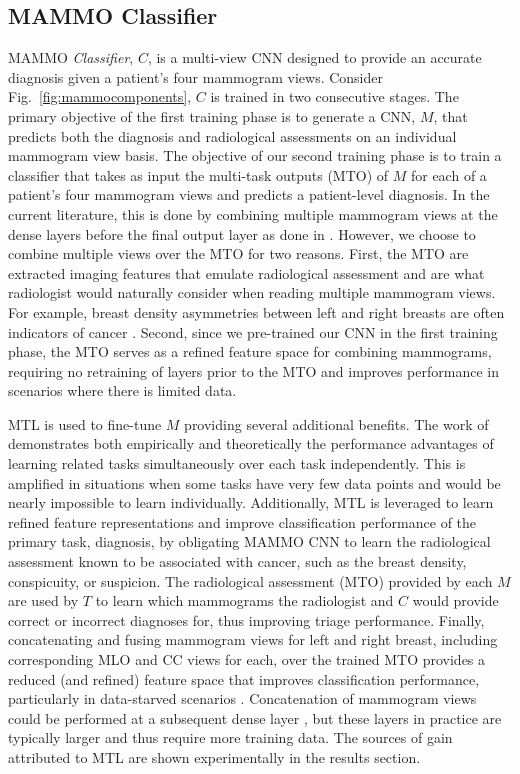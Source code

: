 \documentclass[journal]{IEEEtran}
\begin{document}
\subsection{MAMMO Classifier}
MAMMO \textit{Classifier}, $C$, is a multi-view CNN designed to provide an accurate diagnosis given a patient's four mammogram views. Consider Fig.~\ref{fig:mammocomponents}, $C$ is trained in two consecutive stages.  
The primary objective of the first training phase is to generate a CNN, $M$, that predicts both the diagnosis and radiological assessments on an individual mammogram view basis. 
The objective of our second training phase is to train a classifier that takes as input the multi-task outputs (MTO) of $M$ for each of a patient’s four mammogram views and predicts a patient-level diagnosis. In the current literature, this is done by combining multiple mammogram views at the dense layers before the final output layer as done in \cite{krysztof-etal-2017, carneiro-2017}. However, we choose to combine multiple views over the MTO for two reasons.  First, the MTO are extracted imaging features that emulate radiological assessment and are what radiologist would naturally consider when reading multiple mammogram views. For example, breast density asymmetries between left and right breasts are often indicators of cancer \cite{breast-asymmetry1}. Second, since we pre-trained our CNN in the first training phase, the MTO serves as a refined feature space for combining mammograms, requiring no retraining of layers prior to the MTO and improves performance in scenarios where there is limited data.  


MTL is used to fine-tune $M$ providing several additional benefits.  The work of \cite{argyriou-2006} demonstrates both empirically and theoretically the performance advantages of learning related tasks simultaneously over each task independently.  This is amplified in situations when some tasks have very few data points and would be nearly impossible to learn individually.  Additionally, MTL is leveraged to learn refined feature representations and improve classification performance of the primary task, diagnosis, by obligating MAMMO CNN to learn the radiological assessment known to be associated with cancer, such as the breast density, conspicuity, or suspicion.  The radiological assessment (MTO) provided by each $M$ are used by $T$ to learn which mammograms the radiologist and $C$ would provide correct or incorrect diagnoses for, thus improving triage performance. 
Finally, concatenating and fusing mammogram views for left and right breast, including corresponding MLO and CC views for each, over the trained MTO provides a reduced (and refined) feature space that improves classification performance, particularly in data-starved scenarios \cite{cascade-ensemble}.  Concatenation of mammogram views could be performed at a subsequent dense layer \cite{stacked-ensemble}, but these layers in practice are typically larger and thus require more training data.  The sources of gain attributed to MTL are shown experimentally in the results section.
\end{document}
